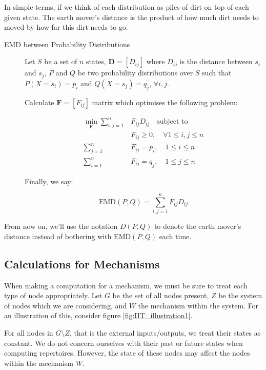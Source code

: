 In simple terms, if we think of each distribution as piles of dirt on top of each given state. The earth mover's distance is the product of how much dirt needs to moved by how far this dirt needs to go. 

\begin{description}
	\item[EMD between Probability Distributions] Let $S$ be a set of $n$ states, $\mathbf{D} = \left[ D_{ij}\right]$ where $D_{ij}$ is the distance between $s_i$ and $s_j$, $P$ and $Q$ be two probability distributions over $S$ such that $P(X = s_i) = p_i$ and $Q(X=s_j) = q_j$, $\forall i,j$. 
	
	Calculate $\mathbf{F} = \left[F_{ij}\right]$ matrix which optimises the following problem:
	
	\begin{align}
	\label{eq:EMD1}
	\min \limits_{\mathbf{F}}\sum \limits_{i,j=1}^n &F_{ij} D_{ij}\quad \text{subject to}\\
	&F_{ij}\geq 0,\quad \forall 1 \leq i,j \leq n\\
	\sum \limits_{j=1}^n &F_{ij} = p_i,\quad 1 \leq i \leq n\\
	\sum \limits_{i=1}^n &F_{ij} = q_j,\quad 1 \leq j \leq n
	\end{align}
	
	Finally, we say: 
	
	\begin{equation}
	\label{def:EMD}
	\text{EMD}(P, Q) = \sum \limits_{i,j=1}^{n} F_{ij} D_{ij}
	\end{equation}
\end{description}

From now on, we'll use the notation $D(P,Q)$ to denote the earth mover's distance instead of bothering with $\text{EMD}(P,Q)$ each time.

\subsection{Calculations for Mechanisms}\label{sec:little_phi}
When making a computation for a mechanism, we must be sure to treat each type of node appropriately. Let $G$ be the set of all nodes present, $Z$ be the system of nodes which we are considering, and $W$ the mechanism within the system. For an illustration of this, consider figure \ref{fig:IIT_illustration1}.

For all nodes in $G\setminus Z$, that is the external inputs/outputs, we treat their states as constant. We do not concern ourselves with their past or future states when computing repertoires. However, the state of these nodes may affect the nodes within the mechanism $W$.

